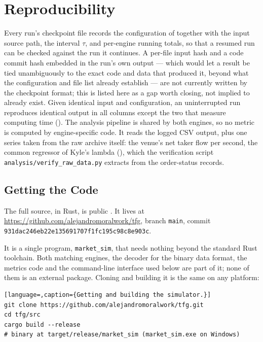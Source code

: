 \chapter{Reproducibility}
\label{app:repro}

Every run's checkpoint file records the configuration of
 together with the input source path, the interval
$\tau$, and per-engine running totals, so that a resumed run can be
checked against the run it continues. A per-file input hash and a code
commit hash embedded in the run's own output --- which would let a
result be tied unambiguously to the exact code and data that produced
it, beyond what the configuration and file list already establish ---
are not currently written by the checkpoint format; this is listed here
as a gap worth closing, not implied to already exist. Given identical
input and configuration, an uninterrupted run reproduces identical
output in all columns except the two that measure computing time
(). The analysis pipeline is shared by both
engines, so no metric is computed by engine-specific code. It reads the
logged CSV output, plus one series taken from the raw archive itself:
the venue's net taker flow per second, the common regressor of Kyle's
lambda (), which the verification script
\texttt{analysis/verify\_raw\_data.py} extracts from the order-status
records.

\section{Getting the Code}
\label{sec:repro_code}

\begin{sloppypar}
The full source, in Rust, is public \citep{moral2026marketsim}. It lives at
\url{https://github.com/alejandromoralwork/tfg}, branch \texttt{main}, commit
\texttt{931dac246eb22e135691707f1fc195c98c8e903c}.
\end{sloppypar}
It is a single program, \texttt{market\_sim}, that needs nothing beyond the
standard Rust toolchain. Both matching engines, the decoder for the binary
data format, the metrics code and the command-line interface used below are
part of it; none of them is an external package. Cloning and building it is
the same on any platform:

\begin{lstlisting}[language=,caption={Getting and building the simulator.}]
git clone https://github.com/alejandromoralwork/tfg.git
cd tfg/src
cargo build --release
# binary at target/release/market_sim (market_sim.exe on Windows)
\end{lstlisting}

